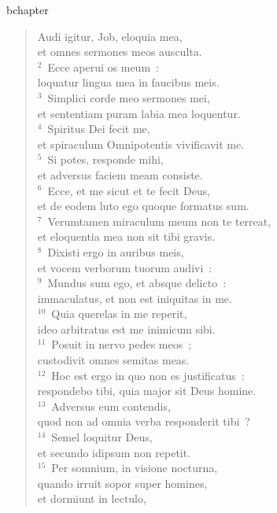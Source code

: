 bchapter\begin{flushleft}\begin{verse}\vspace{-19pt}\hspace{6pt}Audi igitur, Job, eloquia mea,\\\hspace{6pt} et omnes sermones meos ausculta.\\
${}^{2}$~Ecce aperui os meum~:\\ loquatur lingua mea in faucibus meis.\\
${}^{3}$~Simplici corde meo sermones mei,\\ et sententiam puram labia mea loquentur.\\
${}^{4}$~Spiritus Dei fecit me,\\ et spiraculum Omnipotentis vivificavit me.\\
${}^{5}$~Si potes, responde mihi,\\ et adversus faciem meam consiste.\\
${}^{6}$~Ecce, et me sicut et te fecit Deus,\\ et de eodem luto ego quoque formatus sum.\\
${}^{7}$~Verumtamen miraculum meum non te terreat,\\ et eloquentia mea non sit tibi gravis.\\
${}^{8}$~Dixisti ergo in auribus meis,\\ et vocem verborum tuorum audivi~:\\
${}^{9}$~Mundus sum ego, et absque delicto~:\\ immaculatus, et non est iniquitas in me.\\
${}^{10}$~Quia querelas in me reperit,\\ ideo arbitratus est me inimicum sibi.\\
${}^{11}$~Posuit in nervo pedes meos~;\\ custodivit omnes semitas meas.\\
${}^{12}$~Hoc est ergo in quo non es justificatus~:\\ respondebo tibi, quia major sit Deus homine.\\
${}^{13}$~Adversus eum contendis,\\ quod non ad omnia verba responderit tibi~?\\
${}^{14}$~Semel loquitur Deus,\\ et secundo idipsum non repetit.\\
${}^{15}$~Per somnium, in visione nocturna,\\ quando irruit sopor super homines,\\ et dormiunt in lectulo,\\

\end{verse}
\end{flushleft}
